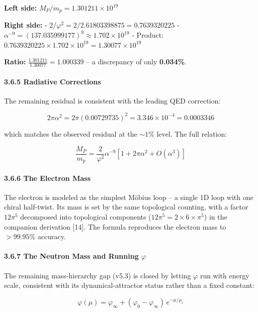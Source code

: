 \documentclass[
]{article}
\begin{document}
\textbf{Left side:} \(M_P/m_p = 1.301211 \times 10^{19}\)

\textbf{Right side:} - \(2/\varphi^2 = 2/2.61803398875 = 0.7639320225\)
- \(\alpha^{-9} = (137.035999177)^9 \approx 1.702 \times 10^{19}\) -
Product:
\(0.7639320225 \times 1.702 \times 10^{19} = 1.30077 \times 10^{19}\)

\textbf{Ratio:} \(\frac{1.301211}{1.30077} = 1.000339\) -- a discrepancy
of only \textbf{0.034\%}.

\paragraph{3.6.5 Radiative Corrections}\label{radiative-corrections}

The remaining residual is consistent with the leading QED correction:

\[2\pi\alpha^2 = 2\pi(0.00729735)^2 = 3.346 \times 10^{-4} = 0.0003346\]

which matches the observed residual at the \(\sim 1\%\) level. The full
relation:

\[\frac{M_P}{m_p} = \frac{2}{\varphi^2} \alpha^{-9} \left[1 + 2\pi\alpha^2 + O(\alpha^3)\right]\]

\paragraph{3.6.6 The Electron Mass}\label{the-electron-mass}

The electron is modeled as the simplest Möbius loop -- a single 1D loop
with one chiral half-twist. Its mass is set by the same topological
counting, with a factor \(12\pi^5\) decomposed into topological
components (\(12\pi^5 = 2 \times 6 \times \pi^5\)) in the companion
derivation {[}14{]}. The formula reproduces the electron mass to
\(> 99.95\%\) accuracy.

\paragraph{\texorpdfstring{3.6.7 The Neutron Mass and Running
\(\varphi\)}{3.6.7 The Neutron Mass and Running \textbackslash varphi}}\label{the-neutron-mass-and-running-varphi}

The remaining mass-hierarchy gap (v5.3) is closed by letting \(\varphi\)
run with energy scale, consistent with its dynamical-attractor status
rather than a fixed constant:

\[\varphi(\mu) = \varphi_\infty + (\varphi_0 - \varphi_\infty)\,e^{-\mu/\mu_c}\]
\end{document}
